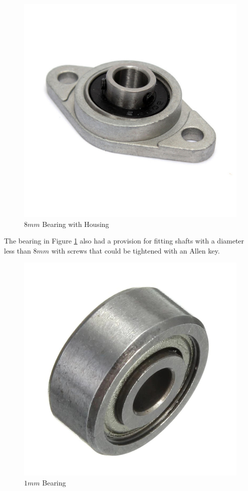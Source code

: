 \begin{figure}[H]
    \centering
    \includegraphics[scale = 0.2]{Figures/pillowBlock.jpg}
    \caption{$8mm$ Bearing with Housing}
    \label{fig:pillowBlock}
\end{figure}
The bearing in Figure \ref{fig:pillowBlock} also had a provision for fitting shafts with a diameter less than $8mm$ with screws that could be tightened with an Allen key.

\begin{figure}[H]
    \centering
    \includegraphics[scale = 0.25]{Figures/wheelBearing.jpg}
    \caption{$1mm$ Bearing}
    \label{fig:wheelBearing}
\end{figure}

